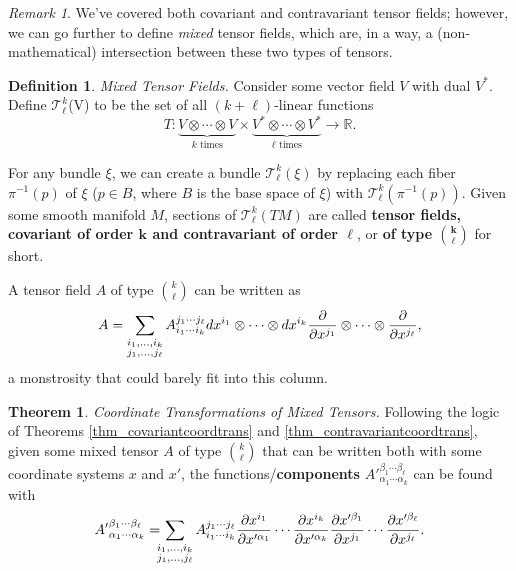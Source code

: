 \documentclass[10pt,landscape]{article}
\theoremstyle{definition}
\newtheorem{definition}{Definition}[section]
\theoremstyle{theorem}
\newtheorem{theorem}{Theorem}[section]
\theoremstyle{summary}
\theoremstyle{remark}
\newtheorem*{remark}{Remark}
\newcommand{\R}{\mathbb{R}}
\begin{document}
\begin{multicols*}{3}
\begin{remark}
    We've covered both covariant and contravariant tensor fields; however, we can go further to define \textit{mixed} tensor fields, which are, in a way, a (non-mathematical) intersection between these two types of tensors.
\end{remark}

\theoremstyle{definition}
\begin{definition}{\textit{Mixed Tensor Fields.}}
    Consider some vector field $V$ with dual $V^*$. Define $\mathcal{T}_\ell^k$(V) to be the set of all $(k+\ell)$-linear functions
    \begin{equation}
        T:\underbrace{V\otimes\cdots\otimes V}_{k\text{ times}}\times\underbrace{V^*\otimes\cdots\otimes V^*}_{\ell\text{ times}}\rightarrow\R .
    \end{equation}
    
    For any bundle $\xi$, we can create a bundle $\mathcal{T}_\ell^k(\xi)$ by replacing each fiber $\pi^{-1}(p)$ of $\xi$ ($p\in B$, where $B$ is the base space of $\xi$) with $\mathcal{T}_\ell^k(\pi^{-1}(p))$. Given some smooth manifold $M$, sections of $\mathcal{T}_\ell^k(TM)$ are called \textbf{tensor fields, covariant of order $\bm{k}$ and contravariant of order $\bm{\ell}$}, or \textbf{of type $\binom{\bm{k}}{\bm{\ell}}$} for short.

    A tensor field $A$ of type $\binom{k}{\ell}$ can be written as
    \begin{equation}
        A = \sum\limits_{
            \substack{
                i_1,\ldots,i_k\\
                j_1,\ldots,j_\ell
            }
        } A_{i_1\cdots i_k}^{j_1\cdots j_\ell}dx^{i_1}\otimes\cdots\otimes dx^{i_k}\pdv{}{x^{j_1}}\otimes\cdots\otimes\pdv{}{x^{j_\ell}},
    \end{equation}
    a monstrosity that could barely fit into this column.
\end{definition}

\begin{theorem}{\textit{Coordinate Transformations of Mixed Tensors.}}
    \label{thm_mixedcoordtrans}
    Following the logic of Theorems \ref{thm_covariantcoordtrans} and \ref{thm_contravariantcoordtrans}, given some mixed tensor $A$ of type $\binom{k}{\ell}$ that can be written both with some coordinate systems $x$ and $x'$, the functions/\textbf{components} ${A'}_{\alpha_1\cdots \alpha_k}^{\beta_1\cdots \beta_\ell}$ can be found with
    \begin{equation}
        {A'}_{\alpha_1\cdots \alpha_k}^{\beta_1\cdots \beta_\ell} = \hspace{-0.5em}\sum\limits_{
            \substack{
                i_1,\ldots,i_k\\
                j_1,\ldots,j_\ell
            }
        } A_{i_1\cdots i_k}^{j_1\cdots j_\ell}\pdv{x^{i_1}}{x'^{\alpha_1}}\cdots\pdv{x^{i_k}}{x'^{\alpha_k}}\pdv{x'^{\beta_1}}{x^{j_1}}\cdots\pdv{x'^{\beta_\ell}}{x^{j_\ell}}.
    \end{equation}
\end{theorem}


\end{multicols*}
\end{document}
